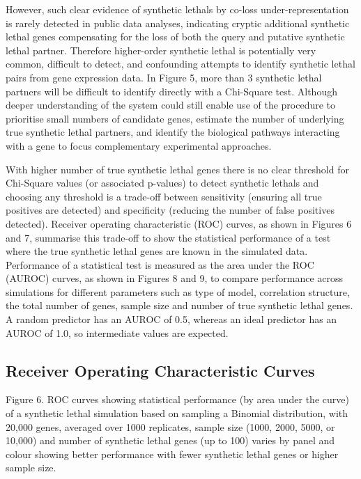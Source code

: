 However, such clear evidence of \glspl{synthetic lethal} by co-loss under-representation is rarely detected in public data analyses, indicating cryptic additional \gls{synthetic lethal} genes compensating for the loss of both the query and putative \gls{synthetic lethal} partner.  Therefore higher-order \gls{synthetic lethal} is potentially very common, difficult to detect, and confounding attempts to identify \gls{synthetic lethal} pairs from \gls{gene expression} data.  In Figure 5, more than 3 \gls{synthetic lethal} partners will be difficult to identify directly with a Chi-Square test.  Although deeper understanding of the system could still enable use of the procedure to prioritise small numbers of candidate genes, estimate the number of underlying true \gls{synthetic lethal} partners, and identify the biological pathways interacting with a gene to focus complementary experimental approaches.

With higher number of true \gls{synthetic lethal} genes there is no clear threshold for Chi-Square values (or associated p-values) to detect \glspl{synthetic lethal} and choosing any threshold is a trade-off between sensitivity (ensuring all true positives are detected) and specificity (reducing the number of false positives detected).  Receiver operating characteristic (ROC) curves, as shown in Figures 6 and 7, summarise this trade-off to show the statistical performance of a test where the true \gls{synthetic lethal} genes are known in the simulated data.  Performance of a statistical test is measured as the area under the \gls{ROC} (AUROC) curves, as shown in Figures 8 and 9, to compare performance across simulations for different parameters such as type of model, correlation structure, the total number of genes, sample size and number of true \gls{synthetic lethal} genes.  A random predictor has an \gls{AUROC} of 0.5, whereas an ideal predictor has an \gls{AUROC} of 1.0, so intermediate values are expected.

\subsection{Receiver Operating Characteristic Curves}

Figure 6.   \gls{ROC} curves showing statistical performance (by area under the curve) of a \gls{synthetic lethal} simulation based on sampling a Binomial distribution, with 20,000 genes, averaged over 1000 replicates, sample size (1000, 2000, 5000, or 10,000) and number of \gls{synthetic lethal} genes (up to 100) varies by panel and colour showing better performance with fewer \gls{synthetic lethal} genes or higher sample size.    

